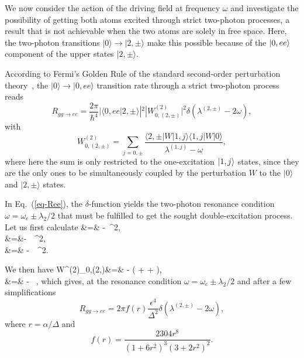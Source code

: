We now consider the action of the driving field at frequency $\omega$ and investigate the possibility of getting both atoms excited through strict two-photon processes, a result that is not achievable when the two atoms are solely in free space. Here, the two-photon transitions $|0\rangle \rightarrow |2,\pm\rangle$ make this possible because of the $| 0,ee \rangle$ component of the upper states $|2,\pm\rangle$.

According to Fermi's Golden Rule of the standard second-order perturbation theory~\cite{Lou00}, the $|0\rangle \rightarrow |0,ee\rangle$ transition rate through a strict two-photon process reads
\[ R_{gg \rightarrow ee} = \frac{2 \pi}{\hbar^4} |\langle 0,ee | 2,\pm \rangle|^2 |W^{(2)}_{0,(2,\pm)}|^2 \delta(\lambda^{(2,\pm)} - 2\omega), \label{eq-Ree}\]
with
\[  W^{(2)}_{0,(2,\pm)} = \sum_{j=0,\pm} \frac{\langle 2,\pm | W |1, j\rangle \langle 1,j | W |0\rangle}{\lambda^{(1,j)}-\omega},\]
where here the sum is only restricted to the one-excitation $| 1,j \rangle$ states, since they are the only ones to be simultaneously coupled by the perturbation $W$  to the $|0\rangle$ and $|2,\pm\rangle$ states.

In Eq.~(\ref{eq-Ree}), the $\delta$-function yields the two-photon resonance condition $\omega = \omega_c \pm \lambda_2/2$ that must be fulfilled to get the sought double-excitation process.  Let us first calculate
\bea
{} &=&  -  \,\epsilon^2, \\
 &=&- \, \,\epsilon^2,\\
 &=& - \, \,\epsilon^2.
\eea

We then have
\bea
W^{(2)}_{0,(2,\pm)}&=& - \left( +  +  \right), \\
&=& - \, ,
\eea
which gives, at the resonance condition $\omega = \omega_c \pm \lambda_2/2$ and after a few simplifications
\begin{equation}
    \label{Pggee2}
    R_{gg \rightarrow ee} = 2 \pi f(r) \frac{\epsilon^4}{\Delta^2} \delta(\lambda^{(2,\pm)} - 2\omega),
\end{equation}
where $r = \alpha/\Delta$ and
\begin{equation}
    f(r) = \frac{2304 r^8}{(1 + 6 r^2)^3 (3 + 2 r^2)^2}.
\end{equation}

